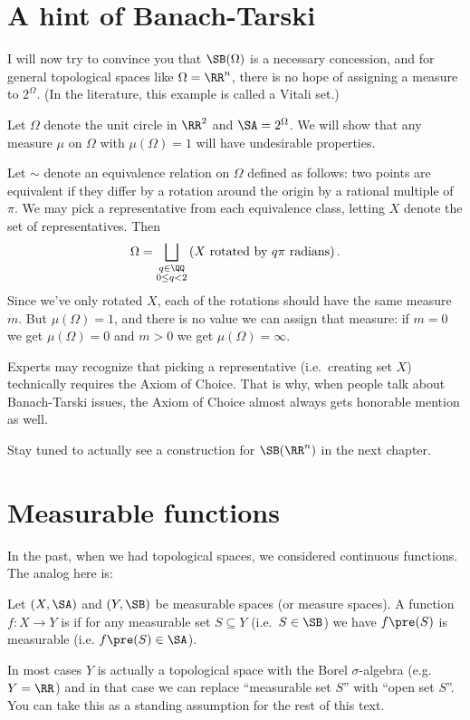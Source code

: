 \section{A hint of Banach-Tarski}
I will now try to convince you that $\SB(\Omega)$
is a necessary concession,
and for general topological spaces like $\Omega = \RR^n$,
there is no hope of assigning a measure to $2^{\Omega}$.
(In the literature, this example is called a Vitali set.)
\begin{example}
	[A geometric example why $\SA = 2^\Omega$ is unsuitable]
	Let $\Omega$ denote the unit circle in $\RR^2$
	and $\SA = 2^\Omega$.
	We will show that any measure $\mu$ on $\Omega$
	with $\mu(\Omega) = 1$ will have undesirable properties.

	Let $\sim$ denote an equivalence relation on $\Omega$
	defined as follows: two points are equivalent
	if they differ by a rotation around the origin by a rational multiple of $\pi$.
	We may pick a representative from each equivalence class,
	letting $X$ denote the set of representatives.
	Then
	\[ \Omega = \bigsqcup_{\substack{q \in \QQ \\ 0 \le q < 2}}
		\left( X \text{ rotated by $q\pi$ radians} \right).  \]
	Since we've only rotated $X$,
	each of the rotations should have the same measure $m$.
	But $\mu(\Omega) = 1$,
	and there is no value we can assign that measure:
	if $m = 0$ we get $\mu(\Omega) = 0$
	and $m > 0$ we get $\mu(\Omega) = \infty$.
\end{example}
\begin{remark}
	[Choice]
	Experts may recognize that picking a representative
	(i.e.\ creating set $X$)
	technically requires the Axiom of Choice.
	That is why, when people talk about Banach-Tarski issues,
	the Axiom of Choice almost always gets honorable mention as well.
\end{remark}

Stay tuned to actually see a construction for $\SB(\RR^n)$
in the next chapter.

\section{Measurable functions}
\label{sec:measurable_functions}
In the past, when we had topological spaces,
we considered continuous functions.
The analog here is:
\begin{definition}
	Let $(X, \SA)$ and $(Y, \SB)$ be measurable spaces
	(or measure spaces).
	A function $f \colon X \to Y$ is 
	if for any measurable set $S \subseteq Y$ (i.e.\ $S \in \SB$)
	we have $f\pre(S)$ is measurable (i.e. $f\pre(S) \in \SA$).

  In most cases $Y$ is actually a topological space with the Borel $\sigma$-algebra
  (e.g.\ $Y = \RR$) and in that case we can replace ``measurable set $S$''
  with ``open set $S$''.
  You can take this as a standing assumption for the rest of this text.
\end{definition}

